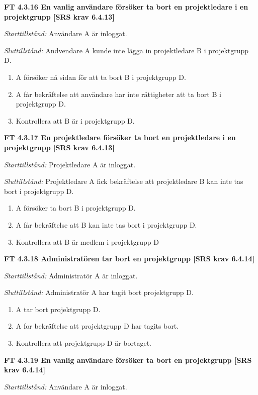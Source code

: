 \documentclass[a4paper]{article}
\begin{document}
\textbf{FT 4.3.16 En vanlig användare försöker ta bort en projektledare i en projektgrupp [SRS krav 6.4.13]}

\emph{Starttillstånd:} Användare A är inloggat.

\emph{Sluttillstånd:} Andvendare A kunde inte lägga in projektledare B i projektgrupp D.

\begin{enumerate}
\item A försöker nå sidan för att ta bort B i projektgrupp D.
\item A får bekräftelse att användare har inte rättigheter att ta bort B i projektgrupp D.
\item Kontrollera att B är i projektgrupp D.
\end{enumerate}

\textbf{FT 4.3.17 En projektledare försöker ta bort en projektledare i en projektgrupp [SRS krav 6.4.13]}

\emph{Starttillstånd:} Projektledare A är inloggat.

\emph{Sluttillstånd:} Projektledare A fick bekräftelse att projektledare B kan inte tas bort i projektgrupp D.

\begin{enumerate}
\item A försöker ta bort B i projektgrupp D.
\item A får bekräftelse att B kan inte tas bort i projektgrupp D.
\item Kontrollera att B är medlem i projektgrupp D
\end{enumerate}

\textbf{FT 4.3.18 Administratören tar bort en projektgrupp [SRS krav 6.4.14]}

\emph{Starttillstånd:} Administratör A är inloggat.

\emph{Sluttillstånd:} Administratör A har tagit bort  projektgrupp D.

\begin{enumerate}
\item A tar bort projektgrupp D.
\item A for bekräftelse att projektgrupp D har tagits bort.
\item Kontrollera att projektgrupp D är bortaget.
\end{enumerate}

\textbf{FT 4.3.19 En vanlig användare försöker ta bort en projektgrupp [SRS krav 6.4.14]}

\emph{Starttillstånd:} Användare A är inloggat.
\end{document}
